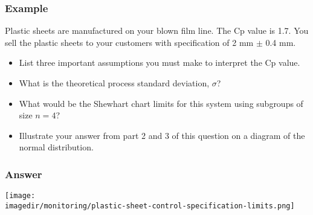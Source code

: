 \begin{frame}\frametitle{Example}
	
	Plastic sheets are manufactured on your blown film line. The Cp value is 1.7. You sell the plastic sheets to your customers with specification of 2 mm $\pm$ 0.4 mm.
	\begin{itemize}
		\item	List three important assumptions you must make to interpret the Cp value. 
		\item	What is the theoretical process standard deviation, $\sigma$? 
		\item	What would be the Shewhart chart limits for this system using subgroups of size $n=4$? 
		\item	Illustrate your answer from part 2 and 3 of this question on a diagram of the normal distribution. 
	\end{itemize}
\end{frame}

\begin{frame}\frametitle{Answer}
	
	\texttt{[image: \\imagedir/monitoring/plastic-sheet-control-specification-limits.png]}
\end{frame}

